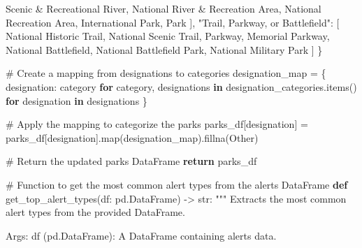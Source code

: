 \documentclass[
  letterpaper,
  DIV=11,
  numbers=noendperiod]{scrartcl}
\newenvironment{Shaded}{\begin{snugshade}}{\end{snugshade}}
\newcommand{\BuiltInTok}[1]{\textcolor[rgb]{0.00,0.23,0.31}{#1}}
\newcommand{\CommentTok}[1]{\textcolor[rgb]{0.37,0.37,0.37}{#1}}
\newcommand{\ControlFlowTok}[1]{\textcolor[rgb]{0.00,0.23,0.31}{\textbf{#1}}}
\newcommand{\KeywordTok}[1]{\textcolor[rgb]{0.00,0.23,0.31}{\textbf{#1}}}
\newcommand{\NormalTok}[1]{\textcolor[rgb]{0.00,0.23,0.31}{#1}}
\newcommand{\OperatorTok}[1]{\textcolor[rgb]{0.37,0.37,0.37}{#1}}
\newcommand{\StringTok}[1]{\textcolor[rgb]{0.13,0.47,0.30}{#1}}
\begin{document}
\begin{Shaded}
\begin{Highlighting}[]
            \StringTok{\textquotesingle{}Scenic \& Recreational River\textquotesingle{}}\NormalTok{, }\StringTok{\textquotesingle{}National River \& Recreation Area\textquotesingle{}}\NormalTok{,}
            \StringTok{\textquotesingle{}National Recreation Area\textquotesingle{}}\NormalTok{, }\StringTok{\textquotesingle{}International Park\textquotesingle{}}\NormalTok{, }\StringTok{\textquotesingle{}Park\textquotesingle{}}
\NormalTok{        ],}
        \StringTok{"Trail, Parkway, or Battlefield"}\NormalTok{: [}
            \StringTok{\textquotesingle{}National Historic Trail\textquotesingle{}}\NormalTok{, }\StringTok{\textquotesingle{}National Scenic Trail\textquotesingle{}}\NormalTok{, }\StringTok{\textquotesingle{}Parkway\textquotesingle{}}\NormalTok{,}
            \StringTok{\textquotesingle{}Memorial Parkway\textquotesingle{}}\NormalTok{, }\StringTok{\textquotesingle{}National Battlefield\textquotesingle{}}\NormalTok{,}
            \StringTok{\textquotesingle{}National Battlefield Park\textquotesingle{}}\NormalTok{, }\StringTok{\textquotesingle{}National Military Park\textquotesingle{}}
\NormalTok{        ]}
\NormalTok{    \}}

    \CommentTok{\# Create a mapping from designations to categories}
\NormalTok{    designation\_map }\OperatorTok{=}\NormalTok{ \{}
\NormalTok{        designation: category}
        \ControlFlowTok{for}\NormalTok{ category, designations }\KeywordTok{in}\NormalTok{ designation\_categories.items()}
        \ControlFlowTok{for}\NormalTok{ designation }\KeywordTok{in}\NormalTok{ designations}
\NormalTok{    \}}

    \CommentTok{\# Apply the mapping to categorize the parks}
\NormalTok{    parks\_df[}\StringTok{\textquotesingle{}designation\textquotesingle{}}\NormalTok{] }\OperatorTok{=}\NormalTok{ parks\_df[}\StringTok{\textquotesingle{}designation\textquotesingle{}}\NormalTok{].}\BuiltInTok{map}\NormalTok{(designation\_map).fillna(}\StringTok{\textquotesingle{}Other\textquotesingle{}}\NormalTok{)}

    \CommentTok{\# Return the updated parks DataFrame}
    \ControlFlowTok{return}\NormalTok{ parks\_df}

\CommentTok{\# Function to get the most common alert types from the alerts DataFrame}
\KeywordTok{def}\NormalTok{ get\_top\_alert\_types(df: pd.DataFrame) }\OperatorTok{{-}\textgreater{}} \BuiltInTok{str}\NormalTok{:}
    \CommentTok{"""}
\CommentTok{    Extracts the most common alert types from the provided DataFrame.}

\CommentTok{    Args:}
\CommentTok{        df (pd.DataFrame): A DataFrame containing alerts data.}


\end{Highlighting}
\end{Shaded}
\end{document}
